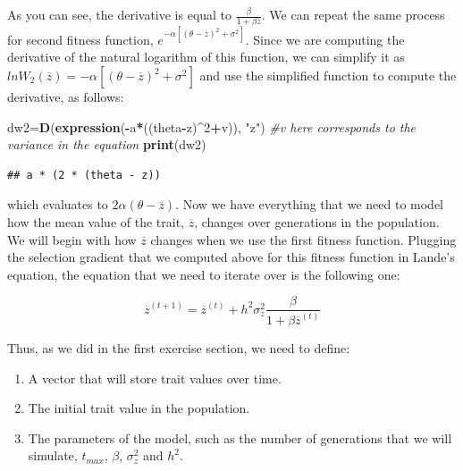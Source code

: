 \documentclass[
]{book}
\newenvironment{Shaded}{\begin{snugshade}}{\end{snugshade}}
\newcommand{\CommentTok}[1]{\textcolor[rgb]{0.56,0.35,0.01}{\textit{#1}}}
\newcommand{\DecValTok}[1]{\textcolor[rgb]{0.00,0.00,0.81}{#1}}
\newcommand{\FunctionTok}[1]{\textcolor[rgb]{0.13,0.29,0.53}{\textbf{#1}}}
\newcommand{\NormalTok}[1]{#1}
\newcommand{\OtherTok}[1]{\textcolor[rgb]{0.56,0.35,0.01}{#1}}
\newcommand{\SpecialCharTok}[1]{\textcolor[rgb]{0.81,0.36,0.00}{\textbf{#1}}}
\newcommand{\StringTok}[1]{\textcolor[rgb]{0.31,0.60,0.02}{#1}}
\providecommand{\tightlist}{%
  \setlength{\itemsep}{0pt}\setlength{\parskip}{0pt}}
\begin{document}
As you can see, the derivative is equal to \(\frac{\beta}{1+\beta \overline{z}}\). We can repeat the same process for second fitness function, \(e^{-\alpha\left[\left(\theta-\overline{z}\right)^2 + \sigma^2\right]}\). Since we are computing the derivative of the natural logarithm of this function, we can simplify it as \(lnW_{2}(\overline{z})=-\alpha\left[\left(\theta-\overline{z}\right)^2 + \sigma^2\right]\) and use the simplified function to compute the derivative, as follows:

\begin{Shaded}
\begin{Highlighting}[]
\NormalTok{dw2}\OtherTok{=}\FunctionTok{D}\NormalTok{(}\FunctionTok{expression}\NormalTok{(}\SpecialCharTok{{-}}\NormalTok{a}\SpecialCharTok{*}\NormalTok{((theta}\SpecialCharTok{{-}}\NormalTok{z)}\SpecialCharTok{\^{}}\DecValTok{2}\SpecialCharTok{+}\NormalTok{v)), }\StringTok{"z"}\NormalTok{) }\CommentTok{\#v here corresponds to the variance in the equation}
\FunctionTok{print}\NormalTok{(dw2)}
\end{Highlighting}
\end{Shaded}

\begin{verbatim}
## a * (2 * (theta - z))
\end{verbatim}

which evaluates to \(2\alpha (\theta-\overline{z})\). Now we have everything that we need to model how the mean value of the trait, \(\overline{z}\), changes over generations in the population. We will begin with how \(\overline{z}\) changes when we use the first fitness function. Plugging the selection gradient that we computed above for this fitness function in Lande's equation, the equation that we need to iterate over is the following one:

\[
\overline{z}^{(t+1)}=\overline{z}^{(t)}+ h^2 \sigma^{2}_{z}\frac{\beta}{1+\beta \overline{z}^{(t)}}
\]

Thus, as we did in the first exercise section, we need to define:

\begin{enumerate}
\def\labelenumi{\arabic{enumi}.}
\tightlist
\item
  A vector that will store trait values over time.
\item
  The initial trait value in the population.
\item
  The parameters of the model, such as the number of generations that we will simulate, \(t_{max}\), \(\beta\), \(\sigma^{2}_{z}\) and \(h^2\).
\end{enumerate}
\end{document}

